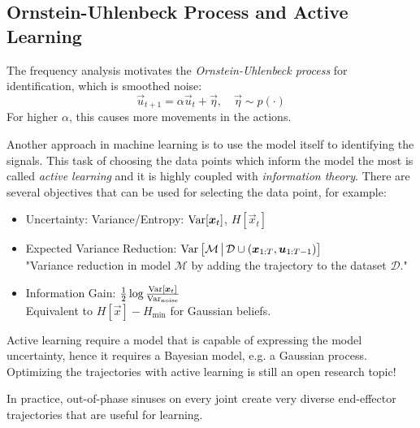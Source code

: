 		\subsection{Ornstein-Uhlenbeck Process and Active Learning}
			The frequency analysis motivates the \emph{Ornstein-Uhlenbeck process} for identification, which is smoothed noise:
			\begin{equation*}
				\vec{u}_{t + 1} = \alpha \vec{u}_t + \vec{\eta},\quad \vec{\eta} \sim p(\cdot)
			\end{equation*}
			For higher \(\alpha\), this causes more movements in the actions.

			Another approach in machine learning is to use the model itself to identifying the signals. This task of choosing the data points which inform the model the most is called \emph{active learning} and it is highly coupled with \emph{information theory}. There are several objectives that can be used for selecting the data point, for example:
			\begin{itemize}
				\item Uncertainty: Variance/Entropy: \( \operatorname{Var}[\bm{x}_t] \), \( H[\vec{x}_t] \)
				\item Expected Variance Reduction: \( \operatorname{Var}\big[ \mathcal{M} \,\big\vert\, \mathcal{D} \cup (\bm{x}_{1:T}, \bm{u}_{1:T - 1}) \big] \) \\ "Variance reduction in model \(\mathcal{M}\) by adding the trajectory to the dataset \(\mathcal{D}\)."
				\item Information Gain: \( \frac{1}{2} \log \frac{\operatorname{Var}[\bm{x}_t]}{\operatorname{Var}_\mathrm{noise}} \) \\ Equivalent to \( H[\vec{x}] - H_\mathrm{min} \) for Gaussian beliefs.
			\end{itemize}
			Active learning require a model that is capable of expressing the model uncertainty, hence it requires a Bayesian model, e.g. a Gaussian process. Optimizing the trajectories with active learning is still an open research topic!

			In practice, out-of-phase sinuses on every joint create very diverse end-effector trajectories that are useful for learning.

